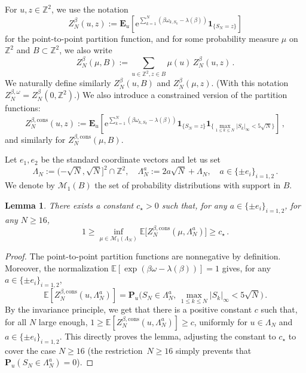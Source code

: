 \documentclass[11pt]{amsart}
\numberwithin{equation}{section}
\newcommand*{\EE}{\mathbb{E}}
\newcommand*{\bE}{\mathbf{E}}
\newcommand*{\bP}{\mathbf{P}}
\newcommand*{\ind}{\mathbf{1}}
\newcommand*{\numberset}{\mathbb}
\newcommand*{\Z}{\numberset{Z}}
\newcommand{\e}{\mathrm{e}}
\newcommand*{\cons}{\mathrm{cons}}
\theoremstyle{plain}
\newtheorem{lemma}[theorem]{Lemma}
\theoremstyle{definition}
\theoremstyle{remark}
\begin{document}
For \(u,z\in\Z^2\), we use the notation
\[
Z_N^{\beta}(u,z)
:= \bE_u\left[ \e^{\sum_{k=1}^{N}(\beta\omega_{k,S_k}-\lambda(\beta))} \ind_{\{S_N=z\}} \right]
\]
for the point-to-point partition function, and for some probability measure \(\mu\) on \(\Z^2\) and \(B\subset \Z^2\), we also write 
\[
Z_N^{\beta}(\mu,B) := \sum_{u\in \Z^2, z\in B} \mu(u) \, Z_N^{\beta}(u,z) \,.
\]
We naturally define similarly \(Z_N^{\beta}(u,B)\) and \(Z_N^{\beta}(\mu,z)\). (With this notation \(Z_N^{\beta,\omega} = Z_N^{\beta}(0,\Z^2)\).)
We also introduce a constrained version of the partition functions:
\[
Z_N^{\beta,\cons}(u,z) := \bE_u\left[ \e^{\sum_{k=1}^{N}(\beta\omega_{k,S_k}-\lambda(\beta))} \ind_{\{S_N=z\}}  \ind_{\{\max_{1\leq k\leq N}|S_k|_\infty < 5 \sqrt{N}\}}\right] \,,
\]
and similarly for \(Z_N^{\beta,\cons}(\mu,B)\).






Let \(e_1,e_2\) be the standard coordinate vectors and let us set
\[
\Lambda_N := (-\sqrt{N}, \sqrt{N}]^2 \cap \Z^2,\quad
\Lambda_N^a:=2a \sqrt{N}+\Lambda_N,\quad a\in\{\pm e_i\}_{i=1,2} \,.
\]
We denote by \(\mathcal{M}_1(B)\) the set of probability distributions with support in \(B\).

\begin{lemma}
       \label{lem:concentration}
       There exists a constant \(c_{\star}>0\) such that, for any $a\in\{\pm e_i\}_{i=1,2}$, for any \(N\geq 16\),
       \[
       1\geq \inf_{\mu \in \mathcal{M}_1(\Lambda_N)} \EE\big[Z_N^{\beta,\cons}(\mu,\Lambda_N^a)\big] \geq c_{\star} \,.
       \]
\end{lemma}


\begin{proof}    
The point-to-point partition functions are nonnegative by definition.  
Moreover, the normalization $\mathbb E[\exp(\beta\omega-\lambda(\beta))]=1$ gives, for any $a\in\{\pm e_i\}_{i=1,2}$,
$$
\mathbb{E}[Z_N^{\beta,\cons}(u,\Lambda_N^{a})] = \bP_u\Big(S_N\in \Lambda_N^{a},\,\max_{1\le k\le N}|S_k|_\infty< 5\sqrt{N}\Big) \,.
$$
By the invariance principle, we get that there is a positive constant \(c\) such that, for all \(N\) large enough, $1\geq \mathbb{E}[Z_N^{\beta,\cons}(u,\Lambda_N^{a})]\geq c$, uniformly for \(u\in \Lambda_N\) and $a\in\{\pm e_i\}_{i=1,2}$. This directly proves the lemma, adjusting the constant to \(c_{\star}\) to cover the case \(N\geq 16\) (the restriction~\(N\geq 16\) simply prevents that \(\bP_u(S_N\in \Lambda_N^a)=0\)).
\end{proof}
\end{document}
